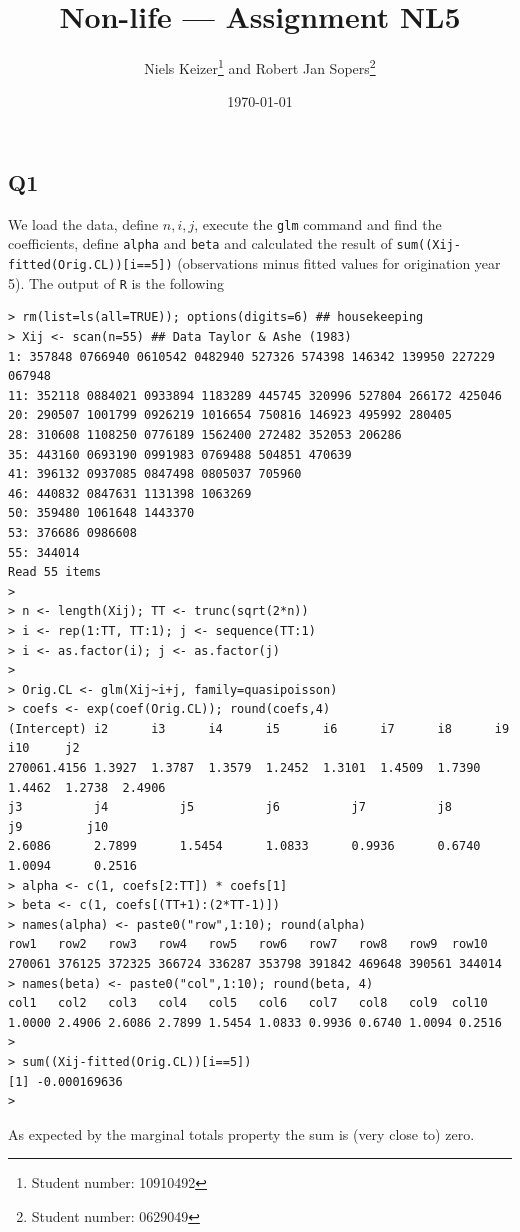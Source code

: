 \documentclass[11pt]{article}
\title{Non-life --- Assignment NL5}  %
\author{
  Niels Keizer\footnote{Student number: 10910492}
  \quad and \quad
  Robert Jan Sopers\footnote{Student number: 0629049}
}
\date{\today}
\begin{document}
\maketitle

\subsection*{Q1}

We load the data, define $n,i,j$, execute the \verb|glm| command and find the coefficients, define \verb|alpha| and \verb|beta| and calculated the result of \verb|sum((Xij-fitted(Orig.CL))[i==5])| (observations minus fitted values for origination year 5). The output of \verb|R| is the following

\begin{verbatim}
> rm(list=ls(all=TRUE)); options(digits=6) ## housekeeping
> Xij <- scan(n=55) ## Data Taylor & Ashe (1983)
1: 357848 0766940 0610542 0482940 527326 574398 146342 139950 227229 067948
11: 352118 0884021 0933894 1183289 445745 320996 527804 266172 425046
20: 290507 1001799 0926219 1016654 750816 146923 495992 280405
28: 310608 1108250 0776189 1562400 272482 352053 206286
35: 443160 0693190 0991983 0769488 504851 470639
41: 396132 0937085 0847498 0805037 705960
46: 440832 0847631 1131398 1063269
50: 359480 1061648 1443370
53: 376686 0986608
55: 344014
Read 55 items
> 
> n <- length(Xij); TT <- trunc(sqrt(2*n))
> i <- rep(1:TT, TT:1); j <- sequence(TT:1)
> i <- as.factor(i); j <- as.factor(j)
> 
> Orig.CL <- glm(Xij~i+j, family=quasipoisson)
> coefs <- exp(coef(Orig.CL)); round(coefs,4)
(Intercept)	i2      i3      i4      i5      i6      i7      i8      i9      i10     j2 
270061.4156 1.3927  1.3787  1.3579  1.2452  1.3101  1.4509  1.7390  1.4462  1.2738  2.4906 
j3          j4          j5          j6          j7          j8          j9         j10 
2.6086      2.7899      1.5454      1.0833      0.9936      0.6740      1.0094      0.2516 
> alpha <- c(1, coefs[2:TT]) * coefs[1]
> beta <- c(1, coefs[(TT+1):(2*TT-1)])
> names(alpha) <- paste0("row",1:10); round(alpha)
row1   row2   row3   row4   row5   row6   row7   row8   row9  row10 
270061 376125 372325 366724 336287 353798 391842 469648 390561 344014 
> names(beta) <- paste0("col",1:10); round(beta, 4)
col1   col2   col3   col4   col5   col6   col7   col8   col9  col10 
1.0000 2.4906 2.6086 2.7899 1.5454 1.0833 0.9936 0.6740 1.0094 0.2516 
> 
> sum((Xij-fitted(Orig.CL))[i==5])
[1] -0.000169636
> 
\end{verbatim}
As expected by the marginal totals property the sum is (very close to) zero.
\end{document}
